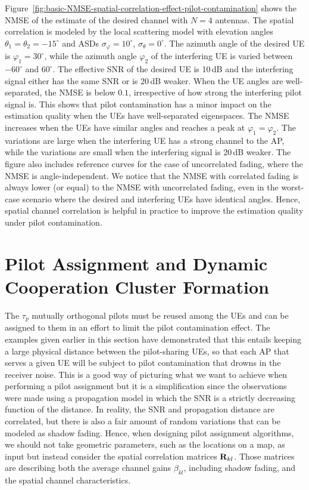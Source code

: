 \enlargethispage{\baselineskip} 

Figure~\ref{fig:basic-NMSE-spatial-correlation-effect-pilot-contamination} shows the \gls{NMSE} of the estimate of the desired channel with $N=4$ antennas. The spatial correlation is modeled by the local scattering model with elevation angles $\theta_1 = \theta_2= -15^\circ$ and ASDs $\sigma_{\varphi}=10^\circ$,  $\sigma_{\theta}=0^\circ$.
The azimuth angle of the desired UE is $\varphi_1 = 30^\circ$, while the azimuth angle $\varphi_2$ of the interfering UE is varied between $-60^\circ$ and $60^\circ$.
The effective \gls{SNR} of the desired \gls{UE} is 10\,dB and the interfering signal either has the same SNR or is 20\,dB weaker. When the \gls{UE} angles are well-separated, the \gls{NMSE} is below $0.1$, irrespective of how strong the interfering pilot signal is. This shows that pilot contamination has a minor impact on the estimation quality when the \glspl{UE} have well-separated eigenspaces. The \gls{NMSE} increases when the \glspl{UE} have similar angles and reaches a peak at $\varphi_1=\varphi_2$. The variations are large when the interfering \gls{UE} has a strong channel to the \gls{AP}, while the variations are small when the interfering signal is 20\,dB weaker. 
The figure also includes reference curves for the case of uncorrelated fading, where the NMSE is angle-independent.
We notice that the NMSE with correlated fading is always lower (or equal) to the NMSE with uncorrelated fading, even in the worst-case scenario where the desired and interfering UEs have identical angles.
Hence, spatial channel correlation is helpful in practice to improve the estimation quality under pilot contamination.


\section{Pilot Assignment and Dynamic Cooperation Cluster Formation}
\label{sec:pilot-assignment}
\label{sec:selecting-DCC}

The $\tau_p$ mutually orthogonal pilots must be reused among the UEs and can be assigned to them in an effort to limit the pilot contamination effect. The examples given earlier in this section have demonstrated that this entails keeping a large physical distance between the pilot-sharing UEs, so that each AP that serves a given UE will be subject to pilot contamination that drowns in the receiver noise. This is a good way of picturing what we want to achieve when performing a pilot assignment but it is a simplification since the observations were made using a propagation model in which the SNR is a strictly decreasing function of the distance. In reality, the SNR and propagation distance are correlated, but there is also a fair amount of random variations that can be modeled as shadow fading.
Hence, when designing pilot assignment algorithms, we should not take geometric parameters, such as the locations on a map, as input but instead consider the spatial correlation matrices $\mathbf{R}_{kl}$. Those matrices are describing both the average channel gains $\beta_{kl}$, including shadow fading, and the spatial channel characteristics.

